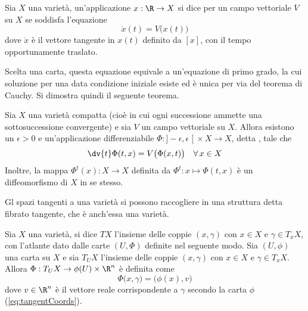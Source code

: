 \begin{definition}
  Sia $X$ una varietà, un'applicazione $x:\R \to X$ si dice  per un campo vettoriale $V$ su $X$ se soddisfa l'equazione \begin{equation*}
  \dot{x}(t) = V\big(x(t)\big)
  \end{equation*} 
  dove $\dot{x}$ è il vettore tangente in $x(t)$ definito da $[x]$, con il tempo opportunamente traslato.
\end{definition}
\begin{remark}
  Scelta una carta, questa equazione equivale a un'equazione di primo grado, la cui soluzione per una data condizione iniziale esiste ed è unica per via del teorema di Cauchy. Si dimostra quindi il seguente teorema.
\end{remark}
\begin{theorem}
  Sia $X$ una varietà compatta (cioè in cui ogni successione ammette una sottosuccessione convergente) e sia $V$ un campo vettoriale su $X$. Allora esistono un $\epsilon > 0$ e un'applicazione differenziabile $\Phi:]-\epsilon, \epsilon\;[\ \times X \to X$, detta , tale che \begin{equation*}
  \dv{t} \Phi(t,x) = V\big( \Phi(x,t)\big) \quad \forall\, x \in  X
  \end{equation*} 
  Inoltre, la mappa $\Phi^t(x):X \to X$ definita da $\Phi^t:x \mapsto \Phi(t,x)$ è un diffeomorfismo di $X$ in se stesso.
\end{theorem}

Gl spazi tangenti a una varietà si possono raccogliere in una struttura detta fibrato tangente, che è anch'essa una varietà.

\begin{definition} \label{def:tanBundle}
  Sia $X$ una varietà, si dice  $TX$ l'insieme delle coppie $(x,\gamma)$ con $x \in X$ e $\gamma \in T_x X$, con l'atlante dato dalle carte $(U, \Phi)$ definite nel seguente modo. Sia $(U, \phi)$ una carta su $X$ e sia $T_U X$ l'insieme delle coppie $(x,\gamma)$ con $x \in X$ e $\gamma \in T_x X$. Allora $\Phi:T_U X \to \phi(U) \times \R^{n}$ è definita come \begin{equation}
  \Phi \big(x,\gamma\big) = \big(\phi(x), v\big)
  \end{equation} 
  dove $v \in \R^{n}$ è il vettore reale corrispondente a $\gamma$ secondo la carta $\phi$ (\autoref{eq:tangentCoords}).
\end{definition}

